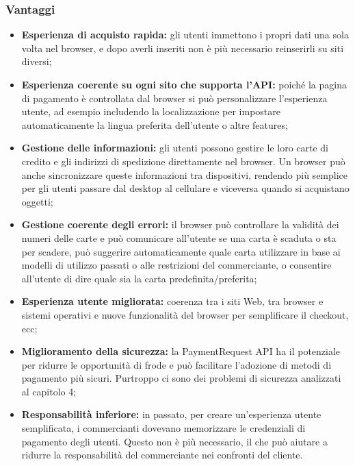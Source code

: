 \documentclass[11pt ,a4paper , twoside , openright ]{article}
\begin{document}
\subsubsection{Vantaggi \cite{rif13}}
\begin{itemize}
	\item \textbf{Esperienza di acquisto rapida:} gli utenti immettono i propri dati una sola volta nel browser, e dopo averli inseriti non è più necessario reinserirli su siti diversi;
	\item \textbf{Esperienza coerente su ogni sito che supporta l'API:} poiché la pagina di pagamento è controllata dal browser si può personalizzare l'esperienza utente, ad esempio includendo la localizzazione per impostare automaticamente la lingua preferita dell'utente o altre features;
	\item \textbf{Gestione delle informazioni:} gli utenti possono gestire le loro carte di credito e gli indirizzi di spedizione direttamente nel browser. Un browser può anche sincronizzare queste informazioni tra dispositivi, rendendo più semplice per gli utenti passare dal desktop al cellulare e viceversa quando si acquistano oggetti;
	\item \textbf{Gestione coerente degli errori:} il browser può controllare la validità dei numeri delle carte e può comunicare all'utente se una carta è scaduta o sta per scadere, può suggerire automaticamente quale carta utilizzare in base ai modelli di utilizzo passati o alle restrizioni del commerciante, o consentire all'utente di dire quale sia la carta predefinita/preferita;
	\item \textbf{Esperienza utente migliorata:} coerenza tra i siti Web, tra browser e sistemi operativi e nuove funzionalità del browser per semplificare il checkout, ecc;
	\item \textbf{Miglioramento della sicurezza:} la PaymentRequest API ha il potenziale per ridurre le opportunità di frode e può facilitare l'adozione di metodi di pagamento più sicuri. Purtroppo ci sono dei problemi di sicurezza analizzati al capitolo 4; 
	\item \textbf{Responsabilità inferiore:} in passato, per creare un'esperienza utente semplificata, i commercianti dovevano memorizzare le credenziali di pagamento degli utenti. Questo non è più necessario, il che può aiutare a ridurre la responsabilità del commerciante nei confronti del cliente.
\end{itemize}
\end{document}
